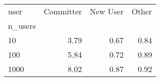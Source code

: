 \begin{tabular}{lrrr}
\toprule
user & Committer & New User & Other \\
n_users &  &  &  \\
\midrule
10 & 3.79 & 0.67 & 0.84 \\
100 & 5.84 & 0.72 & 0.89 \\
1000 & 8.02 & 0.87 & 0.92 \\
\bottomrule
\end{tabular}
